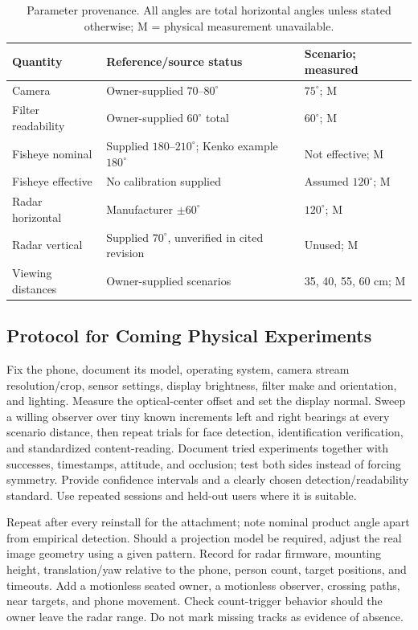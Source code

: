 \documentclass[conference]{IEEEtran}
\newcommand{\degc}{^{\circ}}
\begin{document}
\begin{table}[t]\caption{Parameter provenance. All angles are total horizontal angles unless stated otherwise; M = physical measurement unavailable.}\label{tab:angles}\centering\footnotesize
\begin{tabular}{@{}P{0.25\columnwidth}P{0.38\columnwidth}P{0.26\columnwidth}@{}}\toprule
Quantity & Reference/source status & Scenario; measured\\\midrule
Camera & Owner-supplied $70$--$80\degc$ & $75\degc$; M\\
Filter readability & Owner-supplied $60\degc$ total & $60\degc$; M\\
Fisheye nominal & Supplied $180$--$210\degc$; Kenko example $180\degc$~\cite{Kenko} & Not effective; M\\
Fisheye effective & No calibration supplied & Assumed $120\degc$; M\\
Radar horizontal & Manufacturer $\pm60\degc$~\cite{LD2450} & $120\degc$; M\\
Radar vertical & Supplied $70\degc$, unverified in cited revision & Unused; M\\
Viewing distances & Owner-supplied scenarios & 35, 40, 55, 60 cm; M\\\bottomrule
\end{tabular}\end{table}

\subsection{Protocol for Coming Physical Experiments}
Fix the phone, document its model, operating system, camera stream resolution/crop, sensor settings, display brightness, filter make and orientation, and lighting. Measure the optical-center offset and set the display normal. Sweep a willing observer over tiny known increments left and right bearings at every scenario distance, then repeat trials for face detection, identification verification, and standardized content-reading. Document tried experiments together with successes, timestamps, attitude, and occlusion; test both sides instead of forcing symmetry. Provide confidence intervals and a clearly chosen detection/readability standard. Use repeated sessions and held-out users where it is suitable.

Repeat after every reinstall for the attachment; note nominal product angle apart from empirical detection. Should a projection model be required, adjust the real image geometry using a given pattern. Record for radar firmware, mounting height, translation/yaw relative to the phone, person count, target positions, and timeouts. Add a motionless seated owner, a motionless observer, crossing paths, near targets, and phone movement. Check count-trigger behavior should the owner leave the radar range. Do not mark missing tracks as evidence of absence.
\end{document}
